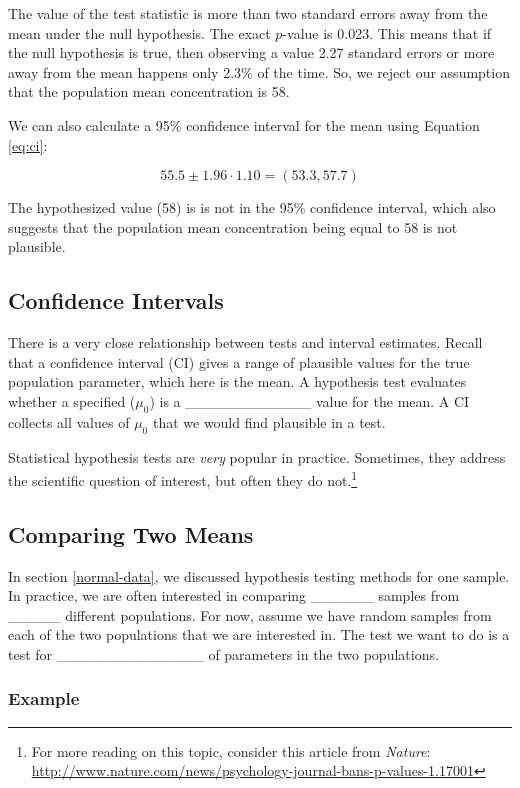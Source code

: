 \documentclass[]{book}
\let\rmarkdownfootnote\footnote%
\def\footnote{\protect\rmarkdownfootnote}
\theoremstyle{definition}
\theoremstyle{definition}
\theoremstyle{remark}
\begin{document}
The value of the test statistic is more than two standard errors away
from the mean under the null hypothesis. The exact \(p\)-value is 0.023.
This means that if the null hypothesis is true, then observing a value
2.27 standard errors or more away from the mean happens only 2.3\% of
the time. So, we reject our assumption that the population mean
concentration is 58.

We can also calculate a 95\% confidence interval for the mean using
Equation \ref{eq:ci}:

\[55.5 \pm 1.96\cdot 1.10 = (53.3, 57.7)\]

The hypothesized value (58) is is not in the 95\% confidence interval,
which also suggests that the population mean concentration being equal
to 58 is not plausible.

\subsection{Confidence Intervals}\label{confidence-intervals}

There is a very close relationship between tests and interval estimates.
Recall that a confidence interval (CI) gives a range of plausible values
for the true population parameter, which here is the mean. A hypothesis
test evaluates whether a specified (\(\mu_0\)) is a
\_\_\_\_\_\_\_\_\_\_\_\_ value for the mean. A CI collects all values of
\(\mu_0\) that we would find plausible in a test.

Statistical hypothesis tests are \emph{very} popular in practice.
Sometimes, they address the scientific question of interest, but often
they do not.\footnote{For more reading on this topic, consider this
  article from \emph{Nature}:
  \url{http://www.nature.com/news/psychology-journal-bans-p-values-1.17001}}

\subsection{Comparing Two Means}\label{comparing-two-means}

In section \ref{normal-data}, we discussed hypothesis testing methods
for one sample. In practice, we are often interested in comparing
\_\_\_\_\_\_ samples from \_\_\_\_\_ different populations. For now,
assume we have random samples from each of the two populations that we
are interested in. The test we want to do is a test for
\_\_\_\_\_\_\_\_\_\_\_\_\_\_ of parameters in the two populations.

\subsubsection{Example}\label{example-1}
\end{document}
